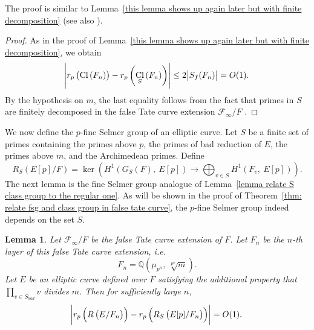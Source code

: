 \documentclass{amsart}
\DeclareMathOperator{\Cl}{Cl}
\newcommand{\QQ}{\mathbb Q}
\newcommand{\F}{\mathcal F}
\newtheorem{Lemma}[Th]{Lemma}
\theoremstyle{definition}
\theoremstyle{remark}
\begin{document}
The proof is similar to Lemma~\ref{this lemma shows up again later but with finite decomposition} (see also \cite[Lemma 5.2]{LM15}).

\begin{proof}
As in the proof of Lemma~\ref{this lemma shows up again later but with finite decomposition}, we obtain
\[
\abs{r_p \left(\Cl\left( F_n\right)\right) - r_p \left(\Cl_S\left( F_n\right)\right)} \leq 2\abs{S_f(F_n)} =O(1).
\]
By the hypothesis on $m$, the last equality follows from the fact that primes in $S$ are finitely decomposed in the false Tate curve extension $\mathcal{F}_\infty/F$ \cite[Lemmas 3.9]{HV03}. 
\end{proof}

We now define the $p$-fine Selmer group of an elliptic curve.
Let $S$ be a finite set of primes containing the primes above $p$, the primes of bad reduction of $E$, the primes above $m$, and the Archimedean primes.
Define
\[
R_{S}\left( E[p]/F\right) = \ker\left( H^1\left( G_S\left( F\right), \ E[p]\right) \rightarrow \bigoplus_{v\in S} H^1\left( F_v, \ E[p]\right)\right).
\]
The next lemma is the fine Selmer group analogue of Lemma~\ref{lemma relate S class group to the regular one}.
As will be shown in the proof of Theorem~\ref{thm: relate fsg and class group in false tate curve}, the $p$-fine Selmer group indeed depends on the set $S$.
\begin{Lemma}
\label{lemma relate p fsg to the primary one}
Let $\F_\infty/F$ be the false Tate curve extension of $F$. 
Let $F_n$ be the $n$-th layer of this false Tate curve extension, i.e.
\[
F_n = \QQ\left(\mu_{p^n}, \ \sqrt[p^n]{m}\right).
\]
Let $E$ be an elliptic curve defined over $F$ satisfying the additional property that $\displaystyle\prod_{v\in S_{bad}} v$ divides $m$.
Then for sufficiently large $n$,
\[
\abs{r_p\left(R\left(E/F_n\right)\right) - r_p\left(R_S\left(E[p]/F_n\right)\right) } = O(1).
\]
\end{Lemma}
\end{document}
